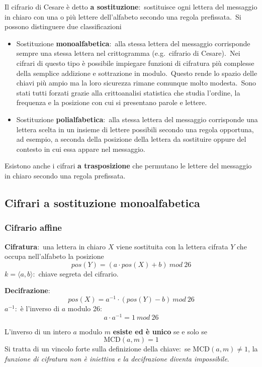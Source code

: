 Il cifrario di Cesare è detto \textbf{a sostituzione}:\ sostituisce ogni lettera del messaggio in chiaro con una o più lettere dell'alfabeto secondo una regola prefissata.\
Si possono distinguere due classificazioni
\begin{itemize}
    \item Sostituzione \textbf{monoalfabetica}:\ alla stessa lettera del messaggio corrisponde sempre una stessa lettera nel crittogramma (e.g.\ cifrario di Cesare).\ Nei cifrari di questo tipo è possibile impiegare funzioni di cifratura più complesse della semplice addizione e sottrazione in modulo.\ Questo rende lo spazio delle chiavi più ampio ma la loro sicurezza rimane comunque molto modesta.\ Sono stati tutti forzati grazie alla crittoanalisi statistica che studia l'ordine, la frequenza e la posizione con cui si presentano parole e lettere.\
    \item Sostituzione \textbf{polialfabetica}:\ alla stessa lettera del messaggio corrisponde una lettera scelta in un insieme di lettere possibili secondo una regola opportuna, ad esempio, a seconda della posizione della lettera da sostituire oppure del contesto in cui essa appare nel messaggio.
\end{itemize}

\noindent Esistono anche i cifrari \textbf{a trasposizione} che permutano le lettere del messaggio in chiaro secondo una regola prefissata.\

\subsection{Cifrari a sostituzione monoalfabetica}

\subsubsection{Cifrario affine}

\textbf{Cifratura}:\ una lettera in chiaro $X$ viene sostituita con la lettera cifrata $Y$ che occupa nell'alfabeto la posizione
\[\mathit{pos}(Y) = (a \cdot \mathit{pos}(X) + b)\ \mathit{mod}\ 26\]
$ k = \langle a,b\rangle$:\ chiave segreta del cifrario.

\vspace{12pt}
\noindent\textbf{Decifrazione}:\
\[\mathit{pos}(X) = a^{-1} \cdot (\mathit{pos}(Y) - b)\ \mathit{mod}\ 26\]
$a^{-1}$:\ è l'inverso di $a$ modulo 26:
\[a \cdot a^{-1} = 1\ \mathit{mod}\ 26\]

\noindent L'inverso di un intero $a$ modulo $m$ \textbf{esiste ed è unico} se e solo se \[\mathrm{MCD}(a, m) = 1\]
Si tratta di un vincolo forte sulla definizione della chiave:\ se $\mathrm{MCD}(a, m) \neq 1$, la \textit{funzione di cifratura non è iniettiva e la decifrazione diventa impossibile}.\

